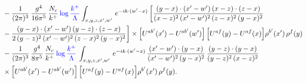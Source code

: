 \documentclass[9pt]{article}
\numberwithin{equation}{section}
\begin{document}
\begin{align}
&-\frac{1}{(2\pi)^{3}}\,\frac{g^{4}}{16\pi^{5}}\,\frac{N_{c}}{k^{+}}\,{\color{blue}\log\frac{k^{+}}{\Lambda}}\int_{x,y,z,x',w'}\,e^{-ik\cdot(w'-x)}\,\bigg[\frac{(y-x)\cdot (x'-w')\,(x-z)\cdot (z-x)}{(x-z)^{2}\,(x'-w')^{2}\,(z-x)^{2}\,(y-x)^{2}}\notag \\ & -\frac{(y-x)\cdot (x'-w')\,(y-z)\cdot (z-x)}{2\,(y-z)^{2}\,(x'-w')^{2}\,(z-x)^{2}\,(y-x)^{2}}\bigg]\times\Big[U^{ab'}(x')-U^{ab'}(w')\Big]\,\Big[U^{af}(y)-U^{af}(x)\Big]\rho^{b'}(x')\,\rho^{f}(y)\notag\\
&-\frac{1}{(2\pi)^{3}}\,\frac{g^{4}}{8\pi^{5}}\,\frac{N_{c}}{k^{+}}\,{\color{blue}\log\frac{k^{+}}{\Lambda}}\,\int_{x,y,z,x',w'}\,e^{-ik\cdot(w'-x)}\,\frac{(x'-w')\cdot(y-x)}{(x'-w')^{2}\,(y-x)^{2}}\,\frac{(y-z)\cdot(y-x)}{(y-z)^{2}\,(x-z)^{2}}\notag\\
&\times\Big[U^{ab'}(x')-U^{ab'}(w')\Big]\,\Big[U^{af}(y)-U^{af}(x)\Big]\rho^{b'}(x')\,\rho^{f}(y).
\end{align}
\end{document}
